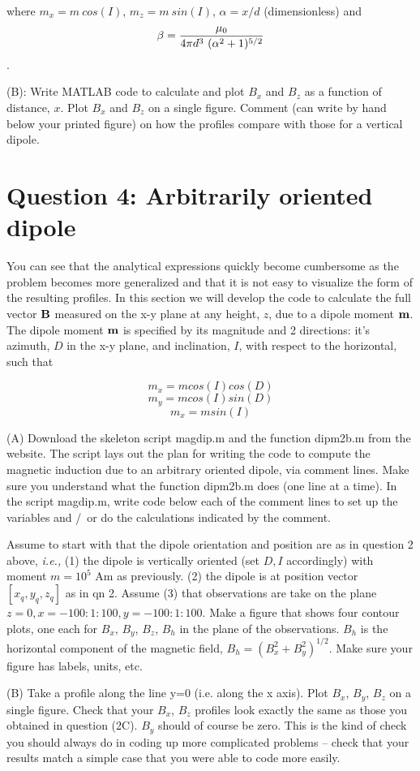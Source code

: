 where $ m_x = m\ cos(I)$, $ m_z = m\ sin(I)$, $\alpha = x/d$ (dimensionless) and 
$$\beta = {\mu_0 \over 4 \pi d^3\ ( \alpha^2+1)^{5/2} }$$.

(B): Write MATLAB code to calculate and plot $B_x$ and $B_z$ as a function of distance, $x$.  Plot $B_x$ and $B_z$ on a single figure.    
Comment (can write by hand below your printed figure) on how the profiles compare with those for a vertical dipole.

\section {Question 4:  Arbitrarily oriented dipole}

You can see that the analytical expressions quickly become cumbersome as the problem becomes more generalized and that it is not easy to visualize the form of the resulting profiles.  In this 
section we will develop the code to calculate the full vector ${\bf B}$ measured on the x-y plane at any height, $z$, due to a dipole moment ${\bf m}$.  The dipole moment ${\bf m}$ is specified by its magnitude and 2 directions:  it's azimuth, $D$ in the x-y plane, and inclination, $I$, with respect to the horizontal, such that

$$ m_x = m cos(I) cos(D)$$
$$ m_y = m cos(I) sin(D)$$
$$ m_x = m sin(I)$$

(A) Download the skeleton script magdip.m and the function dipm2b.m from the website.  The script lays out the plan for writing the code to compute
the magnetic induction due to an arbitrary oriented dipole, via comment lines.  Make sure you understand what the function dipm2b.m does (one line at a time).  In the script magdip.m,  write code below each of the comment lines to set up the variables and \slash\ or do the calculations indicated by the comment.

Assume to start with that the dipole orientation and position are as in question 2 above, {\it i.e.,} (1) the dipole is vertically oriented (set $D, I$ accordingly) with moment $m=10^5$ Am as previously.  (2) the dipole is at position vector $[x_q, y_q, z_q]$ as in qn 2.  Assume (3) that observations are take on the plane $z=0, x=-100:1:100, y=-100:1:100$.  Make a figure that shows four contour plots, one each for $B_x$, $B_y$, $B_z$, $B_h$ in the plane of the observations.  $B_h$ is the horizontal component of the magnetic field, 
$B_h = (B_x^2 + B_y^2)^{1/2}$.  Make sure your figure has labels, units, etc.

(B)  Take a profile along the line y=0 (i.e. along the x axis).  Plot $B_x$, $B_y$, $B_z$ on a single figure.  Check that your $B_x$, $B_z$ profiles look exactly the same as those you obtained in question (2C).  $B_y$ should of course be zero.  This is the kind of check you should always do in coding up more complicated problems -- check that your results match a simple case that you were able to code more easily.  

